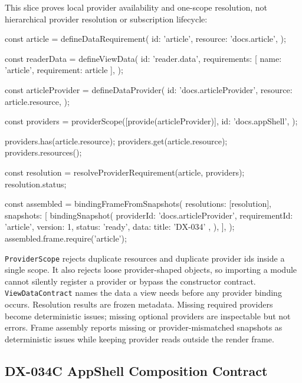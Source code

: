 This slice proves local provider availability and one-scope resolution, not hierarchical provider resolution or subscription lifecycle:

\begin{CodeBlock}
const article = defineDataRequirement({
  id: 'article',
  resource: 'docs.article',
});

const readerData = defineViewData({
  id: 'reader.data',
  requirements: [{ name: 'article', requirement: article }],
});

const articleProvider = defineDataProvider({
  id: 'docs.articleProvider',
  resource: article.resource,
});

const providers = providerScope([provide(articleProvider)], {
  id: 'docs.appShell',
});

providers.has(article.resource);
providers.get(article.resource);
providers.resources();

const resolution = resolveProviderRequirement(article, providers);
resolution.status;

const assembled = bindingFrameFromSnapshots({
  resolutions: [resolution],
  snapshots: [
    bindingSnapshot({
      providerId: 'docs.articleProvider',
      requirementId: 'article',
      version: 1,
      status: 'ready',
      data: { title: 'DX-034' },
    }),
  ],
});
assembled.frame.require('article');
\end{CodeBlock}

\texttt{P\allowbreak{}r\allowbreak{}o\allowbreak{}v\allowbreak{}i\allowbreak{}d\allowbreak{}e\allowbreak{}r\allowbreak{}S\allowbreak{}c\allowbreak{}o\allowbreak{}p\allowbreak{}e} rejects duplicate resources and duplicate provider ids inside a single scope. It also rejects loose provider-shaped objects, so importing a module cannot silently register a provider or bypass the constructor contract. \texttt{V\allowbreak{}i\allowbreak{}e\allowbreak{}w\allowbreak{}D\allowbreak{}a\allowbreak{}t\allowbreak{}a\allowbreak{}C\allowbreak{}o\allowbreak{}n\allowbreak{}t\allowbreak{}r\allowbreak{}a\allowbreak{}c\allowbreak{}t} names the data a view needs before any provider binding occurs. Resolution results are frozen metadata. Missing required providers become deterministic issues; missing optional providers are inspectable but not errors. Frame assembly reports missing or provider-mismatched snapshots as deterministic issues while keeping provider reads outside the render frame.

\subsection{DX-034C AppShell Composition Contract}\label{record-132-dx-034c-appshell-composition-contract}

